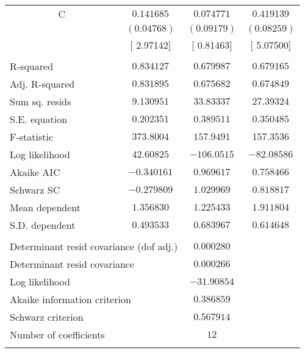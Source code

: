 \begin{tabular}{lrrr}
\multicolumn{1}{c}{C}&\multicolumn{1}{c}{$0.141685$}&\multicolumn{1}{c}{$0.074771$}&\multicolumn{1}{c}{$0.419139$}\\
\multicolumn{1}{c}{}&\multicolumn{1}{c}{$(0.04768)$}&\multicolumn{1}{c}{$(0.09179)$}&\multicolumn{1}{c}{$(0.08259)$}\\
\multicolumn{1}{c}{}&\multicolumn{1}{c}{[ 2.97142]}&\multicolumn{1}{c}{[ 0.81463]}&\multicolumn{1}{c}{[ 5.07500]}\\
[4.5pt] \hline \\ [-4.5pt]
\multicolumn{1}{l}{R-squared}&\multicolumn{1}{c}{$0.834127$}&\multicolumn{1}{c}{$0.679987$}&\multicolumn{1}{c}{$0.679165$}\\
\multicolumn{1}{l}{Adj. R-squared}&\multicolumn{1}{c}{$0.831895$}&\multicolumn{1}{c}{$0.675682$}&\multicolumn{1}{c}{$0.674849$}\\
\multicolumn{1}{l}{Sum sq. resids}&\multicolumn{1}{c}{$9.130951$}&\multicolumn{1}{c}{$33.83337$}&\multicolumn{1}{c}{$27.39324$}\\
\multicolumn{1}{l}{S.E. equation}&\multicolumn{1}{c}{$0.202351$}&\multicolumn{1}{c}{$0.389511$}&\multicolumn{1}{c}{$0.350485$}\\
\multicolumn{1}{l}{F-statistic}&\multicolumn{1}{c}{$373.8004$}&\multicolumn{1}{c}{$157.9491$}&\multicolumn{1}{c}{$157.3536$}\\
\multicolumn{1}{l}{Log likelihood}&\multicolumn{1}{c}{$42.60825$}&\multicolumn{1}{c}{$-106.0515$}&\multicolumn{1}{c}{$-82.08586$}\\
\multicolumn{1}{l}{Akaike AIC}&\multicolumn{1}{c}{$-0.340161$}&\multicolumn{1}{c}{$0.969617$}&\multicolumn{1}{c}{$0.758466$}\\
\multicolumn{1}{l}{Schwarz SC}&\multicolumn{1}{c}{$-0.279809$}&\multicolumn{1}{c}{$1.029969$}&\multicolumn{1}{c}{$0.818817$}\\
\multicolumn{1}{l}{Mean dependent}&\multicolumn{1}{c}{$1.356830$}&\multicolumn{1}{c}{$1.225433$}&\multicolumn{1}{c}{$1.911804$}\\
\multicolumn{1}{l}{S.D. dependent}&\multicolumn{1}{c}{$0.493533$}&\multicolumn{1}{c}{$0.683967$}&\multicolumn{1}{c}{$0.614648$}\\
[4.5pt] \hline \\ [-4.5pt]
\multicolumn{2}{l}{Determinant resid covariance (dof adj.)}&\multicolumn{1}{c}{$0.000280$}&\multicolumn{1}{c}{}\\
\multicolumn{2}{l}{Determinant resid covariance}&\multicolumn{1}{c}{$0.000266$}&\multicolumn{1}{c}{}\\
\multicolumn{1}{l}{Log likelihood}&\multicolumn{1}{c}{}&\multicolumn{1}{c}{$-31.90854$}&\multicolumn{1}{c}{}\\
\multicolumn{2}{l}{Akaike information criterion}&\multicolumn{1}{c}{$0.386859$}&\multicolumn{1}{c}{}\\
\multicolumn{1}{l}{Schwarz criterion}&\multicolumn{1}{c}{}&\multicolumn{1}{c}{$0.567914$}&\multicolumn{1}{c}{}\\
\multicolumn{1}{l}{Number of coefficients}&\multicolumn{1}{c}{}&\multicolumn{1}{c}{$12$}&\multicolumn{1}{c}{}\\
[4.5pt] \hline \\ [-4.5pt]
\end{tabular}
